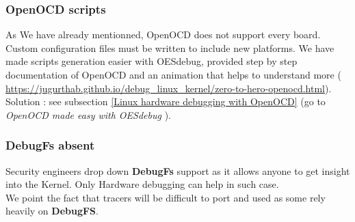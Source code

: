 \subsubsection{OpenOCD scripts}
As We have already mentionned, OpenOCD does not support every board. Custom configuration files must be written to include new platforms. We have made scripts generation easier with OESdebug, provided step by step documentation of OpenOCD and an animation that helps to understand more ({\color{blue} \url{https://jugurthab.github.io/debug_linux_kernel/zero-to-hero-openocd.html}}).\\

{\color{orange}Solution : } see {\color{red}subsection {\color{blue}\ref{Linux hardware debugging with OpenOCD}}} (go to \og \textit{OpenOCD made easy with OESdebug} \fg).


\subsubsection{DebugFs absent}
Security engineers drop down \textbf{DebugFs} support as it allows anyone to get insight into the Kernel. Only Hardware debugging can help in such case.\\
We point the fact that tracers will be difficult to port and used as some rely heavily on \textbf{DebugFS}.
